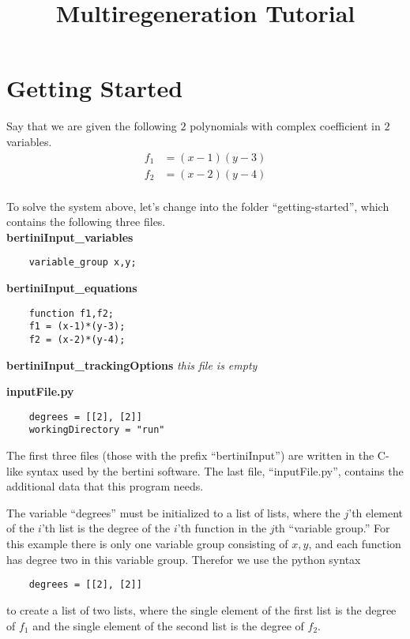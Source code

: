 \documentclass[12pt]{article}
\title{\large \bf
Multiregeneration Tutorial
}
\author{}
\newcommand{\C}{\mathbb{C}}
\begin{document}
\maketitle
\section{Getting Started}
Say that we are given the following $2$ polynomials
with complex coefficient in $2$ variables. 
\begin{align*}
    f_1 &= (x-1)(y-3)\\
    f_2 &= (x-2)(y-4)\\
\end{align*}


\noindent To solve the system above, let's change into the folder 
``getting-started'', which contains the following three files.\\

\noindent \textbf{bertiniInput\_variables}

\begin{lstlisting}
    variable_group x,y; 
\end{lstlisting}

\noindent \textbf{bertiniInput\_equations}

\begin{lstlisting}
    function f1,f2;
    f1 = (x-1)*(y-3);
    f2 = (x-2)*(y-4);
\end{lstlisting}

\noindent \textbf{bertiniInput\_trackingOptions}
\emph{this file is empty}

\noindent \textbf{inputFile.py}
\begin{lstlisting}
    degrees = [[2], [2]]
    workingDirectory = "run"
\end{lstlisting}

The first three files (those with the prefix ``bertiniInput'') are 
written in the C-like syntax used by the bertini software. The last 
file, ``inputFile.py'', contains the additional data that this 
program needs.

The variable ``degrees'' must be initialized to a list of lists, where 
the $j$'th element of the $i$'th list is the degree of the $i$'th 
function in the $j$th ``variable group.'' For this example there is only 
one variable group consisting of $x,y$, and each function has degree two 
in this variable group. Therefor we use the python syntax
\begin{lstlisting}
    degrees = [[2], [2]]
\end{lstlisting}
to create a list of two lists, where the single element of the first 
list is the degree of $f_1$ and the single element of the second list is 
the degree of $f_2$.
\end{document}
